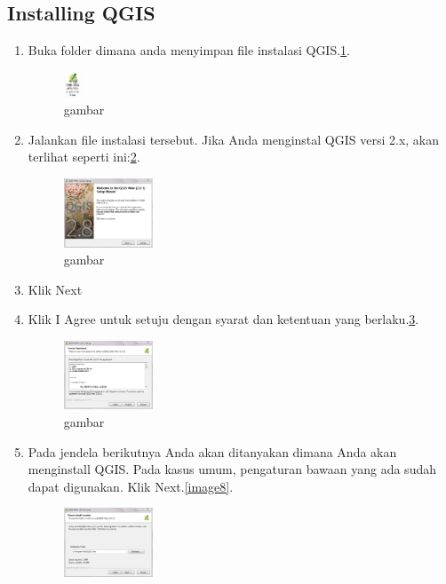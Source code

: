 \subsection{Installing QGIS}
\begin{enumerate}
\item
Buka folder dimana anda menyimpan file instalasi QGIS.\ref{image5}.
\begin{figure}[ht]
        \centerline{\includegraphics[width=0.05\textwidth]{figures/image5}}
        \caption{gambar}
        \label{image5}
        \end{figure}
\item
Jalankan file instalasi tersebut. Jika Anda menginstal QGIS versi 2.x, akan terlihat seperti ini:\ref{image6}.
\begin{figure}[ht]
        \centerline{\includegraphics[width=0.25\textwidth]{figures/image6}}
        \caption{gambar}
        \label{image6}
        \end{figure}
\item 
Klik Next
\item
Klik I Agree untuk setuju dengan syarat dan ketentuan yang berlaku.\ref{image7}.
\begin{figure}[ht]
        \centerline{\includegraphics[width=0.25\textwidth]{figures/image7}}
        \caption{gambar}
        \label{image7}
        \end{figure}
\item
Pada jendela berikutnya Anda akan ditanyakan dimana Anda akan menginstall QGIS. Pada kasus umum, pengaturan bawaan yang ada sudah dapat digunakan. Klik Next.\ref{image8}.
\begin{figure}[ht]
        \centerline{\includegraphics[width=0.25\textwidth]{figures/image8}}

\end{figure}
\end{enumerate}
